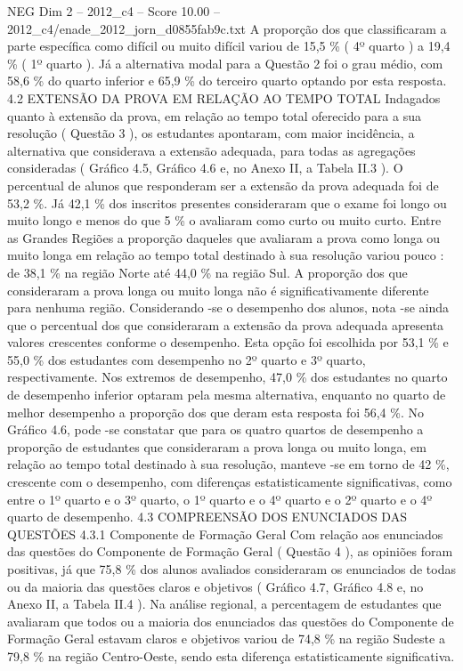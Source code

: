 \begin{textsample}{NEG Dim 2 – 2012\_c4 – Score 10.00 – 2012\_c4/enade\_2012\_jorn\_d0855fab9c.txt}
A proporção dos que classificaram a parte específica como difícil ou muito difícil variou de 15,5 \% ( 4º quarto ) a 19,4 \% ( 1º quarto ).
Já a alternativa modal para a Questão 2 foi o grau médio, com 58,6 \% do quarto inferior e 65,9 \% do terceiro quarto optando por esta resposta. 4.2 EXTENSÃO DA PROVA EM RELAÇÃO AO TEMPO TOTAL Indagados quanto à extensão da prova, em relação ao tempo total oferecido para a sua resolução ( Questão 3 ), os estudantes apontaram, com maior incidência, a alternativa que considerava a extensão adequada, para todas as agregações consideradas ( Gráfico 4.5, Gráfico 4.6 e, no Anexo II, a Tabela II.3 ).
O percentual de alunos que responderam ser a extensão da prova adequada foi de 53,2 \%.
Já 42,1 \% dos inscritos presentes consideraram que o exame foi longo ou muito longo e menos do que 5 \% o avaliaram como curto ou muito curto.
Entre as Grandes Regiões a proporção daqueles que avaliaram a prova como longa ou muito longa em relação ao tempo total destinado à sua resolução variou pouco : de 38,1 \% na região Norte até 44,0 \% na região Sul.
A proporção dos que consideraram a prova longa ou muito longa não é significativamente diferente para nenhuma região.
Considerando -se o desempenho dos alunos, nota -se ainda que o percentual dos que consideraram a extensão da prova adequada apresenta valores crescentes conforme o desempenho.
Esta opção foi escolhida por 53,1 \% e 55,0 \% dos estudantes com desempenho no 2º quarto e 3º quarto, respectivamente.
Nos extremos de desempenho, 47,0 \% dos estudantes no quarto de desempenho inferior optaram pela mesma alternativa, enquanto no quarto de melhor desempenho a proporção dos que deram esta resposta foi 56,4 \%.
No Gráfico 4.6, pode -se constatar que para os quatro quartos de desempenho a proporção de estudantes que consideraram a prova longa ou muito longa, em relação ao tempo total destinado à sua resolução, manteve -se em torno de 42 \%, crescente com o desempenho, com diferenças estatisticamente significativas, como entre o 1º quarto e o 3º quarto, o 1º quarto e o 4º quarto e o 2º quarto e o 4º quarto de desempenho. 4.3 COMPREENSÃO DOS ENUNCIADOS DAS QUESTÕES 4.3.1 Componente de Formação Geral Com relação aos enunciados das questões do Componente de Formação Geral ( Questão 4 ), as opiniões foram positivas, já que 75,8 \% dos alunos avaliados consideraram os enunciados de todas ou da maioria das questões claros e objetivos ( Gráfico 4.7, Gráfico 4.8 e, no Anexo II, a Tabela II.4 ).
Na análise regional, a percentagem de estudantes que avaliaram que todos ou a maioria dos enunciados das questões do Componente de Formação Geral estavam claros e objetivos variou de 74,8 \% na região Sudeste a 79,8 \% na região Centro-Oeste, sendo esta diferença estatisticamente significativa.

\end{textsample}
